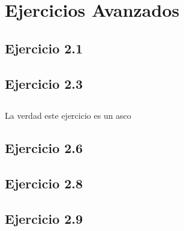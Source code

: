 \newpage

\section{Ejercicios Avanzados}

\subsection{Ejercicio 2.1}


\newpage

\begin{landscape}
	\subsection{}
		
\end{landscape}


\newpage
\subsection{Ejercicio 2.3}


\newpage
\subsection{}


\newpage
\subsection{}
La verdad este ejercicio es un asco

\newpage
\subsection{Ejercicio 2.6}


\subsection{}


\newpage
\subsection{Ejercicio 2.8}


\newpage
\subsection{Ejercicio 2.9}


